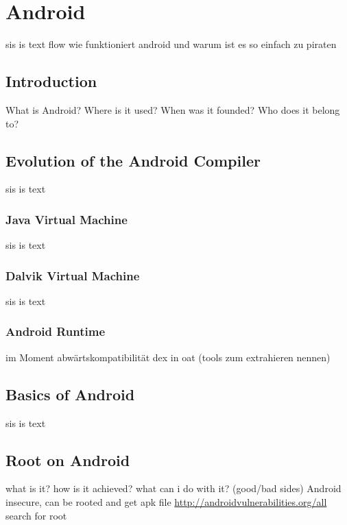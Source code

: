 \section{Android}\label{section:android}
sis is text\newline
flow wie funktioniert android und warum ist es so einfach zu piraten\newline
\subsection{Introduction}\label{subsection:android-history}
What is Android? Where is it used? When was it founded? Who does it belong to?
\subsection{Evolution of the Android Compiler}\label{subsection:android-evolution}
sis is text
\subsubsection{Java Virtual Machine}\label{subsubsection:android-evolution-jvm}
sis is text
\subsubsection{Dalvik Virtual Machine}\label{subsubsection:android-evolution-dvm}
sis is text
\subsubsection{Android Runtime}\label{subsubsection:android-evolution-art}
im Moment abwärtskompatibilität dex in oat (tools zum extrahieren nennen)
\subsection{Basics of Android}\label{subsection:android-basics}
sis is text
\subsection{Root on Android}\label{subsection:android-root}
what is it? how is it achieved? what can i do with it? (good/bad sides)\newline
Android insecure, can be rooted and get apk file \url{http://androidvulnerabilities.org/all} search for root\newline
